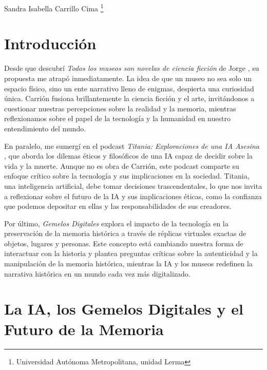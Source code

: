 \documentclass[
  spanish,
  11pt,
  a4paper,
]{scrbook}
\begin{document}
\begin{flushright}
\Large Sandra Isabella Carrillo Cima \footnote{Universidad Autónoma Metropolitana, unidad Lerma}
\end{flushright}

\section*{Introducción}\label{introducciuxf3n-4}


Desde que descubrí \emph{Todos los museos son novelas de ciencia
ficción} de Jorge \textcite{Carrion2022}, su propuesta me atrapó
inmediatamente. La idea de que un museo no sea solo un espacio físico,
sino un ente narrativo lleno de enigmas, despierta una curiosidad única.
Carrión fusiona brillantemente la ciencia ficción y el arte,
invitándonos a cuestionar nuestras percepciones sobre la realidad y la
memoria, mientras reflexionamos sobre el papel de la tecnología y la
humanidad en nuestro entendimiento del mundo.

En paralelo, me sumergí en el podcast \emph{Titania: Exploraciones de
una IA Asesina} \autocite{Bartual2024}, que aborda los dilemas éticos y
filosóficos de una IA capaz de decidir sobre la vida y la muerte. Aunque
no es obra de Carrión, este podcast comparte su enfoque crítico sobre la
tecnología y sus implicaciones en la sociedad. Titania, una inteligencia
artificial, debe tomar decisiones trascendentales, lo que nos invita a
reflexionar sobre el futuro de la IA y sus implicaciones éticas, como la
confianza que podemos depositar en ellas y las responsabilidades de sus
creadores.

Por último, \emph{Gemelos Digitales} \autocite{Carrion2024} explora el
impacto de la tecnología en la preservación de la memoria histórica a
través de réplicas virtuales exactas de objetos, lugares y personas.
Este concepto está cambiando nuestra forma de interactuar con la
historia y plantea preguntas críticas sobre la autenticidad y la
manipulación de la memoria histórica, mientras la IA y los museos
redefinen la narrativa histórica en un mundo cada vez más digitalizado.

\section*{La IA, los Gemelos Digitales y el Futuro de la
Memoria}\label{la-ia-los-gemelos-digitales-y-el-futuro-de-la-memoria}
\end{document}
